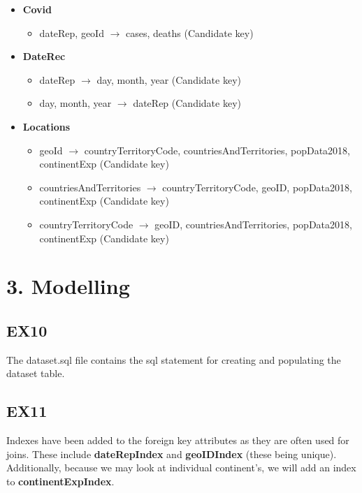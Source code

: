 \documentclass{report}
\begin{document}
\begin{itemize}
    \item \textbf{Covid} 
        \begin{itemize}
            \item dateRep, geoId $\rightarrow$ cases, deaths (Candidate key)
        \end{itemize}
    \item \textbf{DateRec}
        \begin{itemize}
            \item dateRep $\rightarrow$ day, month, year (Candidate key)
            \item day, month, year $\rightarrow$ dateRep  (Candidate key)
        \end{itemize}
   \item \textbf{Locations}
        \begin{itemize}
            \item geoId $\rightarrow$ countryTerritoryCode, countriesAndTerritories, popData2018, continentExp (Candidate key)
            \item countriesAndTerritories $\rightarrow$ countryTerritoryCode, geoID, popData2018, continentExp (Candidate key)
            \item countryTerritoryCode $\rightarrow$ geoID, countriesAndTerritories, popData2018, continentExp (Candidate key)
            
        \end{itemize}
\end{itemize}
\vspace{2mm}

\section*{3. Modelling}
\subsection*{EX10}
The dataset.sql file contains the sql statement for creating and populating the dataset table.
\subsection*{EX11}
Indexes have been added to the foreign key attributes as they are often used for joins. These include \textbf{dateRepIndex} and \textbf{geoIDIndex} (these being unique). Additionally, because we may look at individual continent's, we will add an index to \textbf{continentExpIndex}. 
\end{document}
